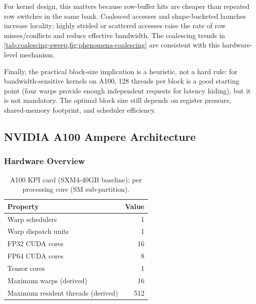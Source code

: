 For kernel design, this matters because row-buffer hits are cheaper than
repeated row switches in the same bank. Coalesced accesses and shape-bucketed
launches increase locality; highly strided or scattered accesses raise the rate
of row misses/conflicts and reduce effective bandwidth. The coalescing trends in
\cref{tab:coalescing-sweep,fig:phenomena-coalescing} are consistent with this
hardware-level mechanism.

Finally, the practical block-size implication is a heuristic, not a hard rule:
for bandwidth-sensitive kernels on A100, \num{128} threads per block is a good
starting point (four warps provide enough independent requests for latency
hiding), but it is not mandatory. The optimal block size still depends on
register pressure, shared-memory footprint, and scheduler efficiency.

\subsection{NVIDIA A100 Ampere Architecture}\label{sec:a100}
\subsubsection{Hardware Overview}

\begin{table}[H]
\centering
\caption{A100 KPI card (SXM4-40GB baseline): per processing core
  (SM sub-partition).}
\label{tab:a100-specs-core}
\begin{tabularx}{\textwidth}{X r}
\toprule
Property & Value \\
\midrule
Warp schedulers & \num{1} \\
Warp dispatch units & \num{1} \\
FP32 CUDA cores & \num{16} \\
FP64 CUDA cores & \num{8} \\
Tensor cores & \num{1} \\
Maximum warps (derived) & \num{16} \\
Maximum resident threads (derived) & \num{512} \\
\bottomrule
\end{tabularx}
\end{table}

